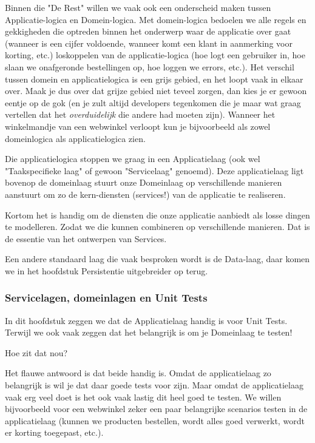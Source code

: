 Binnen die "De Rest" willen we vaak ook een onderscheid maken tussen Applicatie-logica en Domein-logica.
Met domein-logica bedoelen we alle regels en gekkigheden die optreden binnen het onderwerp waar de applicatie 
over gaat (wanneer is een cijfer voldoende, wanneer komt een klant in aanmerking voor korting, etc.) loskoppelen
van de applicatie-logica (hoe logt een gebruiker in, hoe slaan we onafgeronde bestellingen op, hoe loggen we
errors, etc.). Het verschil tussen domein en applicatielogica is een grijs gebied, en het loopt vaak in elkaar over.
Maak je dus over dat grijze gebied niet teveel zorgen, dan kies je er gewoon eentje op de gok
(en je zult altijd developers tegenkomen die je maar wat graag vertellen dat het \emph{overduidelijk} die andere had moeten zijn). 
Wanneer het winkelmandje van een webwinkel verloopt kun je bijvoorbeeld als zowel domeinlogica als applicatielogica zien.

Die applicatielogica stoppen we graag in een Applicatielaag (ook wel "Taakspecifieke laag" of gewoon "Servicelaag" genoemd).
Deze applicatielaag ligt bovenop de domeinlaag stuurt onze Domeinlaag op verschillende manieren aanstuurt om zo de kern-diensten (services!) van de 
applicatie te realiseren. 

Kortom het is handig om de diensten die onze applicatie aanbiedt als losse dingen te modelleren. Zodat 
we die kunnen combineren op verschillende manieren. Dat is de essentie van het ontwerpen van Services.

Een andere standaard laag die vaak besproken wordt is de Data-laag, daar komen we in het hoofdstuk Persistentie
uitgebreider op terug.

\subsubsection*{Servicelagen, domeinlagen en Unit Tests}

In dit hoofdstuk zeggen we dat de Applicatielaag handig is voor Unit Tests. Terwijl we ook vaak zeggen dat het
belangrijk is om je Domeinlaag te testen!

Hoe zit dat nou?

Het flauwe antwoord is dat beide handig is. Omdat de applicatielaag zo belangrijk is wil je dat daar goede 
tests voor zijn. Maar omdat de applicatielaag vaak erg veel doet is het ook vaak lastig dit heel goed te testen.
We willen bijvoorbeeld voor een webwinkel zeker een paar belangrijke scenarios testen in de applicatielaag 
(kunnen we producten bestellen, wordt alles goed verwerkt, wordt er korting toegepast, etc.).

